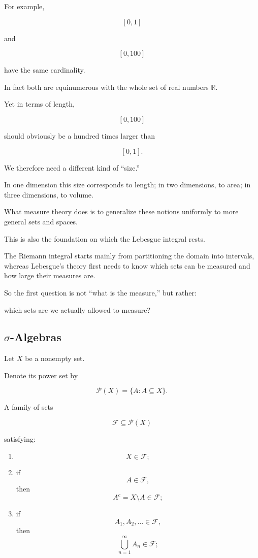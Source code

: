 \documentclass[11pt]{article}
\begin{document}
For example,

\[
[0,1]
\]

and

\[
[0,100]
\]

have the same cardinality.

In fact both are equinumerous with the whole set of real numbers $\mathbb{R}$.

Yet in terms of length,

\[
[0,100]
\]

should obviously be a hundred times larger than

\[
[0,1].
\]

We therefore need a different kind of ``size.''

In one dimension this size corresponds to length; in two dimensions, to area; in three dimensions, to volume.

What measure theory does is to generalize these notions uniformly to more general sets and spaces.

This is also the foundation on which the Lebesgue integral rests.

The Riemann integral starts mainly from partitioning the domain into intervals, whereas Lebesgue's theory first needs to know which sets can be measured and how large their measures are.

So the first question is not ``what is the measure,'' but rather:

which sets are we actually allowed to measure?

\subsection{$\sigma$-Algebras}

Let $X$ be a nonempty set.

Denote its power set by

\[
\mathcal{P}(X)=\{A:A\subseteq X\}.
\]

A family of sets

\[
\mathcal{F}\subseteq\mathcal{P}(X)
\]

satisfying:

\begin{enumerate}
  \item \[
  X\in\mathcal{F};
  \]
  \item if
  \[
  A\in\mathcal{F},
  \]
  then
  \[
  A^{c}=X\setminus A\in\mathcal{F};
  \]
  \item if
  \[
  A_{1},A_{2},\ldots\in\mathcal{F},
  \]
  then
  \[
  \bigcup_{n=1}^{\infty}A_{n}\in\mathcal{F};
  \]
\end{enumerate}
\end{document}
